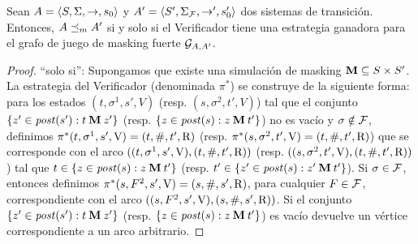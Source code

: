 \begin{theorem} \label{thm:wingame_strat}
  Sean $A=\langle S, \Sigma, \rightarrow, s_0 \rangle$ y $A'=\langle S', \Sigma_{\mathcal{F}}, \rightarrow', s'_0 \rangle$ dos sistemas de transición.
  Entonces, $A \preceq_{m} A'$ si y solo si el Verificador tiene una estrategia ganadora para el grafo de juego de masking fuerte $\mathcal{G}_{A, A'}$.
\end{theorem}
\begin{proof} 
	``solo si'': Supongamos que existe una simulación de masking $\mathbin{\mathbf{M}} \subseteq S \times S'$.
La estrategia del Verificador (denominada $\pi^*$) se construye de la siguiente forma:  para los estados $(t, \sigma^1, s', V)$ (resp. $(s, \sigma^2, t', V)$) tal que el conjunto $\{ z' \in \mathit{post}(s'): t \mathbin{\mathbf{M}} z' \}$
(resp. $\{ z \in \mathit{post}(s): z \mathbin{\mathbf{M}} t' \}$) no es vacío y $\sigma \notin \mathcal{F}$, definimos $\pi^*(t, \sigma^1, s', \mathrm{V}) = (t, \#, t', \mathrm{R})$ 
(resp. $\pi^*(s, \sigma^2, t', \mathrm{V}) = (t, \#, t', \mathrm{R})$) que se corresponde con el arco $((t, \sigma^1, s', \mathrm{V}), (t, \#, t', \mathrm{R}))$ (resp. $((s, \sigma^2, t', \mathrm{V}),(t, \#, t', \mathrm{R}))$) tal que $t \in \{ z \in \mathit{post}(s): z \mathbin{\mathbf{M}} t' \}$ (resp. $t' \in \{ z' \in \mathit{post}(s): z' \mathbin{\mathbf{M}} t' \}$).  Si $\sigma \in \mathcal{F}$, entonces definimos $\pi^*(s, F^2, s', \mathrm{V}) = (s, \#, s', \mathrm{R})$, para cualquier $F \in \mathcal{F}$, correspondiente con el arco $((s, F^2, s', \mathrm{V}),( s, \#, s', \mathrm{R}))$. Si el conjunto $\{ z' \in \mathit{post}(s'): t \mathbin{\mathbf{M}} z' \}$  (resp. $\{ z \in \mathit{post}(s): z \mathbin{\mathbf{M}} t' \}$) 
es vacío devuelve un vértice correspondiente a un arco arbitrario. 


\end{proof}
